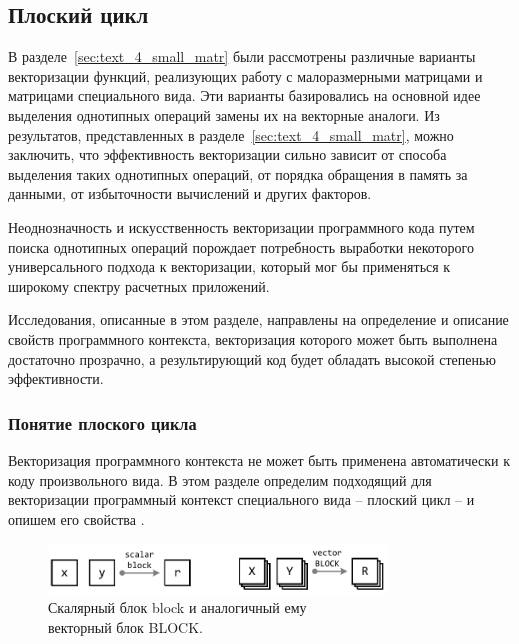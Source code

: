 
\subsection{Плоский цикл}\label{sec:text_4_flat}

В разделе~\ref{sec:text_4_small_matr} были рассмотрены различные варианты векторизации функций, реализующих работу с малоразмерными матрицами и матрицами специального вида.
Эти варианты базировались на основной идее выделения однотипных операций замены их на векторные аналоги.
Из результатов, представленных в разделе~\ref{sec:text_4_small_matr}, можно заключить, что эффективность векторизации сильно зависит от способа выделения таких однотипных операций, от порядка обращения в память за данными, от избыточности вычислений и других факторов.

Неоднозначность и искусственность векторизации программного кода путем поиска однотипных операций порождает потребность выработки некоторого универсального подхода к векторизации, который мог бы применяться к широкому спектру расчетных приложений.

Исследования, описанные в этом разделе, направлены на определение и описание свойств программного контекста, векторизация которого может быть выполнена достаточно прозрачно, а результирующий код будет обладать высокой степенью эффективности.

\subsubsection{Понятие плоского цикла}

Векторизация программного контекста не может быть применена автоматически к коду произвольного вида.
В этом разделе определим подходящий для векторизации программный контекст специального вида -- плоский цикл -- и опишем его свойства \cite{Shabanov2021VecCFG}.

\begin{figure}[ht]
\centering
\includegraphics[width=0.8\textwidth]{./fig/vec_block_BLOCK.pdf}
\singlespacing
{}\caption{Скалярный блок block и аналогичный ему \\ векторный блок BLOCK.}
\label{fig:text_4_vec_flat_fun_FUN}
\end{figure}

